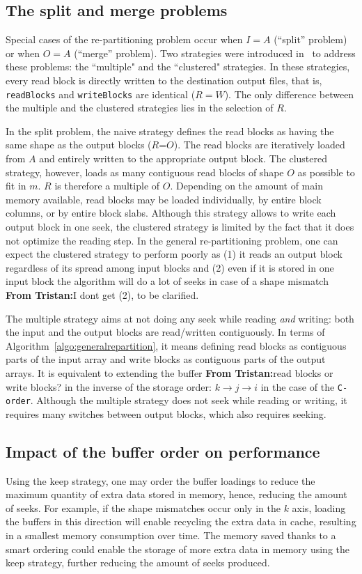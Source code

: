 \documentclass[sigconf, nonacm]{acmart}
\newcommand{\tristan}[1]{\color{orange}\textbf{From Tristan:}#1\color{black}}
\begin{document}
\subsection{The split and merge problems}

Special cases of the re-partitioning problem occur when $I=A$ (``split'' problem)
or when $O=A$ (``merge'' problem). Two strategies were introduced
in~\cite{seqalgorithms} to address these problems: the ``multiple" and the
``clustered" strategies. In these strategies, every read block is directly written to the
destination output files, that is, \texttt{readBlocks} and \texttt{writeBlocks} are identical ($R=W$).
The only difference between the multiple and the clustered strategies lies in
the selection of $R$.

In the split problem, the naive
strategy defines the read blocks as having the same shape as the output blocks
($R$=$O$). The read blocks are iteratively loaded from $A$ and entirely written
to the appropriate output block.
The clustered strategy, however, loads as
many contiguous read blocks of shape $O$ as possible to fit in $m$.
$R$ is therefore a multiple of $O$.
Depending on the amount of main memory available, read blocks may be loaded
individually, by entire block columns, or by entire block slabs.
Although this strategy allows to write each output block in one seek, the clustered strategy is limited by the fact
that it does not optimize the reading step.
In the general re-partitioning problem, one can expect the clustered strategy to
perform poorly as
(1) it reads an output block regardless of its spread among input blocks
and (2) even if it is stored in one input block the algorithm will do a lot of seeks in
case of a shape mismatch \tristan{I dont get (2), to be clarified}.

The multiple strategy
aims at not doing any seek while reading \textit{and} writing:
both the input and the output blocks are read/written contiguously. In
terms of Algorithm~\ref{algo:generalrepartition}, it means defining read blocks as
contiguous parts of the input array and write blocks as contiguous parts of
the output arrays. It is equivalent to extending the buffer \tristan{read blocks or write blocks?} in the inverse of
the storage order: $k \rightarrow j \rightarrow i$ in the case
of the \texttt{C-order}. Although the multiple strategy does not seek while reading or writing, it 
requires many switches between output blocks, which also requires seeking. 




\subsection{Impact of the buffer order on performance}
Using the keep strategy, one may order the buffer loadings to reduce the maximum
quantity of extra data stored in memory, hence, reducing the amount of seeks.
For example, if the shape mismatches occur only in the $k$ axis, loading the
buffers in this direction will enable recycling the extra data in cache,
resulting in a smallest memory consumption over time.
The memory saved thanks to a smart
ordering could enable the storage of more extra data in memory using the
keep strategy, further reducing the amount of seeks produced.
\end{document}
